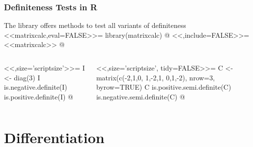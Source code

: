 \documentclass[%
  final,
  11pt, 
  show notes, %
  t, %
  fleqn, %
]{beamer}
\begin{document}
\begin{frame}[fragile]
  \frametitle{Definiteness Tests in R}
The library \verb@matrixcalc@ offers methods to test all variants of definiteness
<<matrixcalc,eval=FALSE>>=
library(matrixcalc)
@
<<,include=FALSE>>=
<<matrixcalc>>
@
\vspace*{-0.4cm}
\begin{columns}[T]
\begin{column}{.35\textwidth}
<<,size='scriptsize'>>=
I <- diag(3)
I
is.negative.definite(I)
is.positive.definite(I)
@
\end{column}
\begin{column}{.55\textwidth}
<<,size='scriptsize', tidy=FALSE>>=
C <- matrix(c(-2,1,0, 1,-2,1, 0,1,-2), 
            nrow=3, byrow=TRUE)
C
is.positive.semi.definite(C)
is.negative.semi.definite(C)
@
\end{column}
\end{columns}
\end{frame}

\section{Differentiation}

\end{document}
